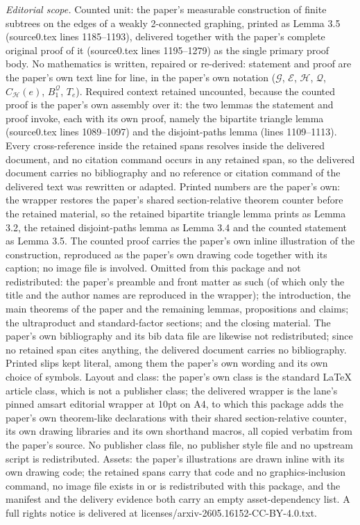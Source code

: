 \documentclass[10pt,a4paper]{amsart}
\theoremstyle{plain}
\theoremstyle{definition}
\providecommand{\cG}{\mathcal{G}}
\providecommand{\cQ}{\mathcal{Q}}
\providecommand{\cE}{\mathcal{E}}
\providecommand{\cH}{\mathcal{H}}
\begin{document}
\noindent\textit{Editorial scope.} Counted unit: the paper's measurable construction of finite subtrees on the edges of a weakly 2-connected graphing, printed as Lemma 3.5 (source0.tex lines 1185--1193), delivered together with the paper's complete original proof of it (source0.tex lines 1195--1279) as the single primary proof body. No mathematics is written, repaired or re-derived: statement and proof are the paper's own text line for line, in the paper's own notation ($\cG$, $\cE$, $\cH$, $\cQ$, $C_{\cH}(e)$, $B_1^{\cQ}$, $T_e$). Required context retained uncounted, because the counted proof is the paper's own assembly over it: the two lemmas the statement and proof invoke, each with its own proof, namely the bipartite triangle lemma (source0.tex lines 1089--1097) and the disjoint-paths lemma (lines 1109--1113). Every cross-reference inside the retained spans resolves inside the delivered document, and no citation command occurs in any retained span, so the delivered document carries no bibliography and no reference or citation command of the delivered text was rewritten or adapted. Printed numbers are the paper's own: the wrapper restores the paper's shared section-relative theorem counter before the retained material, so the retained bipartite triangle lemma prints as Lemma 3.2, the retained disjoint-paths lemma as Lemma 3.4 and the counted statement as Lemma 3.5. The counted proof carries the paper's own inline illustration of the construction, reproduced as the paper's own drawing code together with its caption; no image file is involved. Omitted from this package and not redistributed: the paper's preamble and front matter as such (of which only the title and the author names are reproduced in the wrapper); the introduction, the main theorems of the paper and the remaining lemmas, propositions and claims; the ultraproduct and standard-factor sections; and the closing material. The paper's own bibliography and its bib data file are likewise not redistributed; since no retained span cites anything, the delivered document carries no bibliography. Printed slips kept literal, among them the paper's own wording and its own choice of symbols. Layout and class: the paper's own class is the standard LaTeX article class, which is not a publisher class; the delivered wrapper is the lane's pinned amsart editorial wrapper at 10pt on A4, to which this package adds the paper's own theorem-like declarations with their shared section-relative counter, its own drawing libraries and its own shorthand macros, all copied verbatim from the paper's source. No publisher class file, no publisher style file and no upstream script is redistributed. Assets: the paper's illustrations are drawn inline with its own drawing code; the retained spans carry that code and no graphics-inclusion command, no image file exists in or is redistributed with this package, and the manifest and the delivery evidence both carry an empty asset-dependency list. A full rights notice is delivered at licenses/arxiv-2605.16152-CC-BY-4.0.txt.
\end{document}
